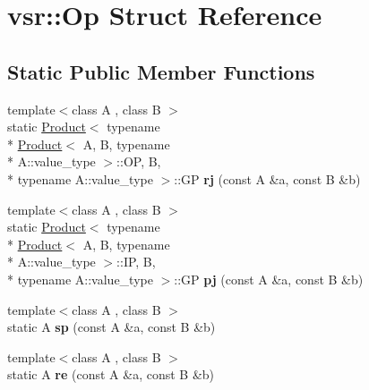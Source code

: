 \hypertarget{structvsr_1_1_op}{\section{vsr\-:\-:Op Struct Reference}
\label{structvsr_1_1_op}
}
\subsection*{Static Public Member Functions}
\begin{DoxyCompactItemize}
\item 
\hypertarget{structvsr_1_1_op_a79d561c5cb7049d6a76cbd4b8173893f}{{\footnotesize template$<$class A , class B $>$ }\\static \hyperlink{structvsr_1_1_product}{Product}$<$ typename \\*
\hyperlink{structvsr_1_1_product}{Product}$<$ A, B, typename \\*
A\-::value\-\_\-type $>$\-::O\-P, B, \\*
typename A\-::value\-\_\-type $>$\-::G\-P {\bfseries rj} (const A \&a, const B \&b)}\label{structvsr_1_1_op_a79d561c5cb7049d6a76cbd4b8173893f}

\item 
\hypertarget{structvsr_1_1_op_ac1da973d68ee5da853e708eca342ccd9}{{\footnotesize template$<$class A , class B $>$ }\\static \hyperlink{structvsr_1_1_product}{Product}$<$ typename \\*
\hyperlink{structvsr_1_1_product}{Product}$<$ A, B, typename \\*
A\-::value\-\_\-type $>$\-::I\-P, B, \\*
typename A\-::value\-\_\-type $>$\-::G\-P {\bfseries pj} (const A \&a, const B \&b)}\label{structvsr_1_1_op_ac1da973d68ee5da853e708eca342ccd9}

\item 
\hypertarget{structvsr_1_1_op_a394833c61ca20bc55a6b7f11c430a37a}{{\footnotesize template$<$class A , class B $>$ }\\static A {\bfseries sp} (const A \&a, const B \&b)}\label{structvsr_1_1_op_a394833c61ca20bc55a6b7f11c430a37a}

\item 
\hypertarget{structvsr_1_1_op_abb615cbaabf4fea59fe991db4e137ae9}{{\footnotesize template$<$class A , class B $>$ }\\static A {\bfseries re} (const A \&a, const B \&b)}\label{structvsr_1_1_op_abb615cbaabf4fea59fe991db4e137ae9}


\end{DoxyCompactItemize}

